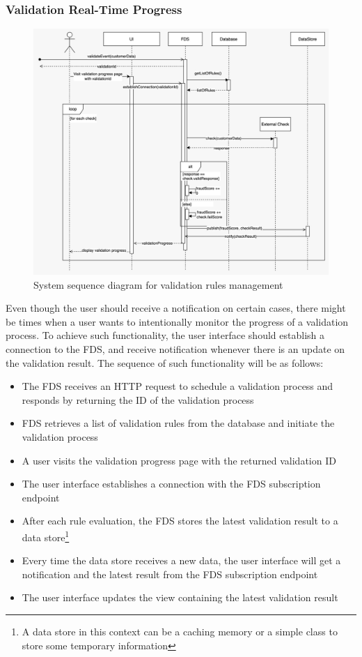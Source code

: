 \subsubsection{Validation Real-Time Progress}

\begin{figure}[!ht]
 \includegraphics[width=\textwidth]{diagrams/sequence_pubsub.jpeg}
 \caption{System sequence diagram for validation rules management}
\end{figure}

Even though the user should receive a notification on certain cases, there might be times when a user wants to intentionally monitor the progress of a validation process. To achieve such functionality, the user interface should establish a connection to the FDS, and receive notification whenever there is an update on the validation result. The sequence of such functionality will be as follows:

\begin{itemize}
 \item The FDS receives an HTTP request to schedule a validation process and responds by returning the ID of the validation process
 \item FDS retrieves a list of validation rules from the database and initiate the validation process
 \item A user visits the validation progress page with the returned validation ID
 \item The user interface establishes a connection with the FDS subscription endpoint
 \item After each rule evaluation, the FDS stores the latest validation result to a data store\footnote{A data store in this context can be a caching memory or a simple class to store some temporary information}
 \item Every time the data store receives a new data, the user interface will get a notification and the latest result from the FDS subscription endpoint
 \item The user interface updates the view containing the latest validation result
\end{itemize}

